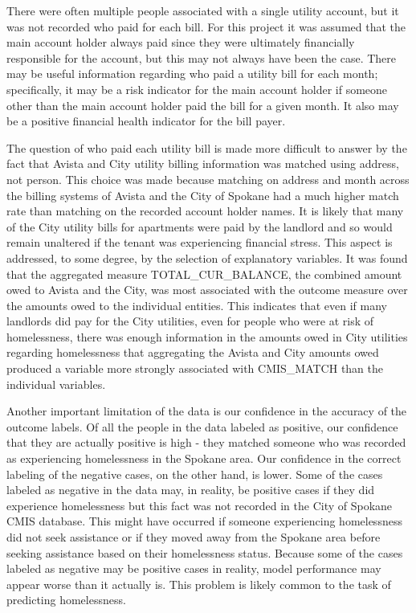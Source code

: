 \documentclass[10pt,letterpaper]{article}
\begin{document}
There were often multiple people associated with a single utility account, but it was not recorded who paid for each bill. For this project it was assumed that the main account holder always paid since they were ultimately financially responsible for the account, but this may not always have been the case. There may be useful information regarding who paid a utility bill for each month; specifically, it may be a risk indicator for the main account holder if someone other than the main account holder paid the bill for a given month. It also may be a positive financial health indicator for the bill payer.

The question of who paid each utility bill is made more difficult to answer by the fact that Avista and City utility billing information was matched using address, not person. This choice was made because matching on address and month across the billing systems of Avista and the City of Spokane had a much higher match rate than matching on the recorded account holder names. It is likely that many of the City utility bills for apartments were paid by the landlord and so would remain unaltered if the tenant was experiencing financial stress. This aspect is addressed, to some degree, by the selection of explanatory variables. It was found that the aggregated measure TOTAL\_CUR\_BALANCE, the combined amount owed to Avista and the City, was most associated with the outcome measure over the amounts owed to the individual entities. This indicates that even if many landlords did pay for the City utilities, even for people who were at risk of homelessness, there was enough information in the amounts owed in City utilities regarding homelessness that aggregating the Avista and City amounts owed produced a variable more strongly associated with CMIS\_MATCH than the individual variables.

Another important limitation of the data is our confidence in the accuracy of the outcome labels. Of all the people in the data labeled as positive, our confidence that they are actually positive is high - they matched someone who was recorded as experiencing homelessness in the Spokane area. Our confidence in the correct labeling of the negative cases, on the other hand, is lower. Some of the cases labeled as negative in the data may, in reality, be positive cases if they did experience homelessness but this fact was not recorded in the City of Spokane CMIS database. This might have occurred if someone experiencing homelessness did not seek assistance or if they moved away from the Spokane area before seeking assistance based on their homelessness status. Because some of the cases labeled as negative may be positive cases in reality, model performance may appear worse than it actually is. This problem is likely common to the task of predicting homelessness.
\end{document}
